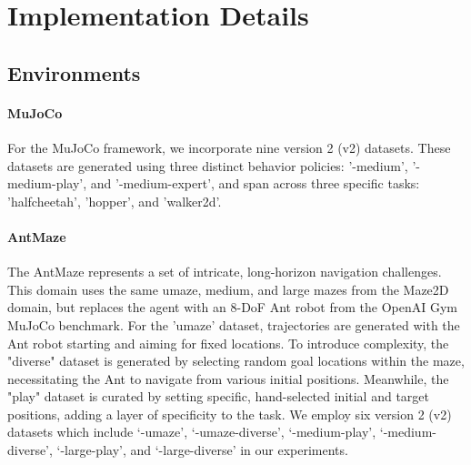 \section{Implementation Details}
\label{sec:appendix-exp-details}
\subsection{Environments}
\paragraph{MuJoCo}
 For the MuJoCo framework, we incorporate nine version 2 (v2) datasets. These datasets are generated using three distinct behavior policies: '-medium', '-medium-play', and '-medium-expert', and span across three specific tasks: 'halfcheetah', 'hopper', and 'walker2d'.  
 
\paragraph{AntMaze}
The AntMaze represents a set of intricate, long-horizon navigation challenges. This domain uses the same umaze, medium, and large mazes from the Maze2D domain, but replaces the agent with an 8-DoF Ant robot from the OpenAI Gym MuJoCo benchmark. For the 'umaze' dataset, trajectories are generated with the Ant robot starting and aiming for fixed locations. To introduce complexity, the "diverse" dataset is generated by selecting random goal locations within the maze, necessitating the Ant to navigate from various initial positions. Meanwhile, the "play" dataset is curated by setting specific, hand-selected initial and target positions, adding a layer of specificity to the task. We employ six version 2 (v2) datasets which include ‘-umaze', ‘-umaze-diverse', ‘-medium-play', ‘-medium-diverse', ‘-large-play', and ‘-large-diverse' in our experiments.

